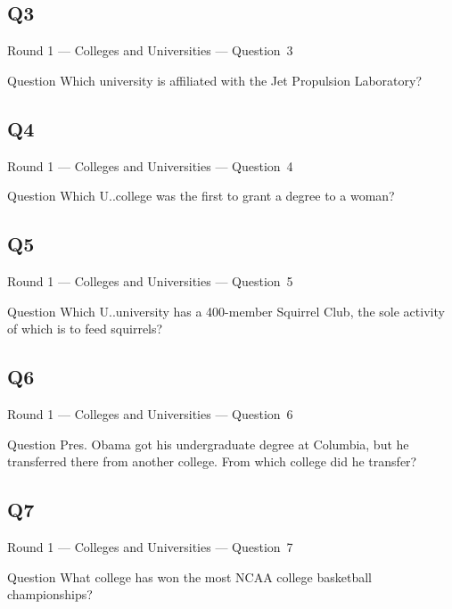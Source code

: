 \documentclass[11pt]{beamer}
\begin{document}
\subsection*{Q3}
\begin{frame}[t]{Round 1 --- Colleges and Universities --- \mbox{Question 3}}
\vspace{-0.5em}
\begin{block}{Question}
Which university is affiliated with the Jet Propulsion Laboratory?
\end{block}
\end{frame}
\subsection*{Q4}
\begin{frame}[t]{Round 1 --- Colleges and Universities --- \mbox{Question 4}}
\vspace{-0.5em}
\begin{block}{Question}
Which U.\@S.\@ college was the first to grant a degree to a woman?
\end{block}
\end{frame}
\subsection*{Q5}
\begin{frame}[t]{Round 1 --- Colleges and Universities --- \mbox{Question 5}}
\vspace{-0.5em}
\begin{block}{Question}
Which U.\@S.\@ university  has a 400-member Squirrel Club, the sole activity of which is to feed squirrels?
\end{block}
\end{frame}
\subsection*{Q6}
\begin{frame}[t]{Round 1 --- Colleges and Universities --- \mbox{Question 6}}
\vspace{-0.5em}
\begin{block}{Question}
Pres. Obama got his undergraduate degree at Columbia, but he transferred there from another college. From which college did he transfer?
\end{block}
\end{frame}
\subsection*{Q7}
\begin{frame}[t]{Round 1 --- Colleges and Universities --- \mbox{Question 7}}
\vspace{-0.5em}
\begin{block}{Question}
What college has won the most NCAA college basketball championships?
\end{block}
\end{frame}
\end{document}
